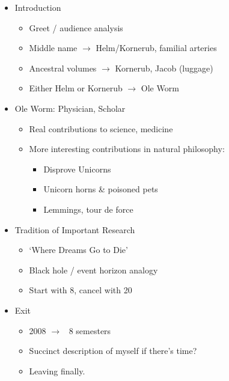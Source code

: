 \documentclass{article}
\begin{document}
  \begin{itemize}
    \item Introduction
      \begin{itemize}
        \item Greet / audience analysis
        \item Middle name $\rightarrow$ Helm/Kornerub, familial arteries
        \item Ancestral volumes $\rightarrow$ Kornerub, Jacob (luggage)
        \item Either Helm or Kornerub $\rightarrow$ Ole Worm
      \end{itemize}
      
    \item Ole Worm: Physician, Scholar
      \begin{itemize}
        \item Real contributions to science, medicine
        \item More interesting contributions in natural philosophy:
          \begin{itemize}
            \item Disprove Unicorns
            \item Unicorn horns \& poisoned pets
            \item Lemmings, tour de force
          \end{itemize}
      \end{itemize}
    
    \item Tradition of Important Research
      \begin{itemize}
        \item `Where Dreams Go to Die' 
        \item Black hole / event horizon analogy
        \item Start with 8, cancel with 20
      \end{itemize}
      
    \item Exit
      \begin{itemize}
        \item 2008 $\rightarrow$ ~8 semesters
        \item Succinct description of myself if there's time?
        \item Leaving finally. 
      \end{itemize}
      
  \end{itemize}
\end{document}
